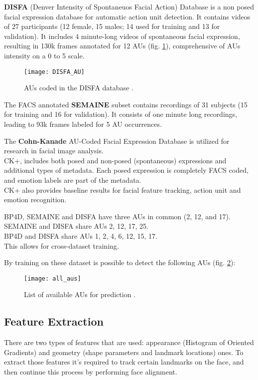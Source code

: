 \textbf{DISFA} (Denver Intensity of Spontaneuos Facial Action) Database is a non posed facial expression database for automatic action unit detection. It contains videos of 27 participants (12 female, 15 males; 14 used for training and 13 for validation). It includes 4 minute-long videos of spontaneous facial expression, resulting in 130k frames annotated for 12 AUs (fig. \ref{fig:DISFA_AU}), comprehensive of AUs intensity on a 0 to 5 scale.

\begin{figure}[H]
	\centering
	\texttt{[image: DISFA\_AU]}
	\caption{AUs coded in the DISFA database \cite{DISFA_AU}.}
	\label{fig:DISFA_AU}
\end{figure}

The FACS annotated \textbf{SEMAINE} subset contains recordings of 31 subjects (15 for training and 16 for validation). It consists of one minute long recordings, leading to 93k frames labeled for 5 AU occurrences.

The \textbf{Cohn-Kanade} AU-Coded Facial Expression Database is utilized for research in facial image analysis. \\
CK+, includes both posed and non-posed (spontaneous) expressions and additional types of metadata. Each posed expression is completely FACS coded, and emotion labels are part of the metadata. \\
CK+ also provides baseline results for facial feature tracking, action unit and emotion recognition.

BP4D, SEMAINE and DISFA have three AUs in common (2, 12, and 17). \\
SEMAINE and DISFA share AUs 2, 12, 17, 25. \\
BP4D and DISFA share AUs 1, 2, 4, 6, 12, 15, 17. \\
This allows for cross-dataset training.

By training on these dataset is possible to detect the following AUs (fig. \ref{fig:all_AUs}):

\begin{figure}[H]
	\centering
	\texttt{[image: all\_aus]}
	\caption{List of available AUs for prediction \cite{Baltru2018}.}
	\label{fig:all_AUs}
\end{figure}


\subsection{Feature Extraction}
There are two types of features that are used: appearance (Histogram of Oriented Gradients) and geometry (shape parameters and landmark locations) ones. To extract those features it's required to track certain landmarks on the face, and then continue this process by performing face alignment.

